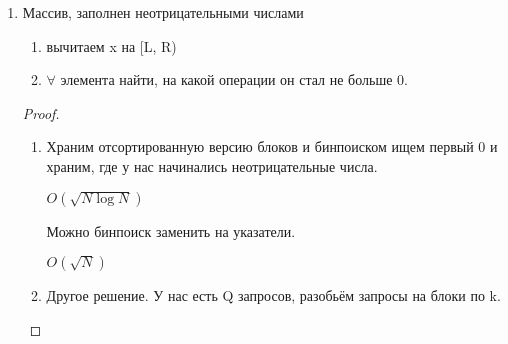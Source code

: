\begin{enumerate}
\begin{proof}
\begin{enumerate}
    \begin{cppcode}
    multiset<int> S;
    s.erase(x);//удаляет все x
    s.erase(s.find(x)); //удалить один x
    \end{cppcode}

    При ответе на запрос делаем find в нужных блоках и в остальных пробегаемся втупую.

    Когда делаем добавку, нужно искать $x - add_i$ 

   \item Другое решение "--- хранить отсортированные блоки массива и там искать бинпоиском. На двух блоках, где что-то 
    испортили втупую отсортируем куски. $O(\frac{N}{k} + k \log (k))$

    Можно отсортировать куски за линию. Разделить кусок на две части "--- префикс и суффикс, к одной части прибавили, 
    а дальше merge. Теперь прибавление работает за $O(\frac{N}{k} + k)$

    Ответ на запрос работает за $O(k + \frac{N}{k} \log k)$

    $k = \sqrt{N \log N}$

    $$\sqrt{N \log N} + \frac{N \log {\sqrt {N\log (N)}}}{ \sqrt{N \log N}} =
    \sqrt{N} \frac{\frac12(\log N + \log \log N)}{\sqrt{\log N}} = \sqrt{N \log N}$$
   \end{enumerate}
   \end{proof}

\item Массив, заполнен неотрицательными числами
    \begin{enumerate}
    \item вычитаем x на [L, R)
    \item $\forall$ элемента найти, на какой операции он стал не больше 0.
    \end{enumerate} 

    \begin{proof}
    \begin{enumerate}
    
    \item Храним отсортированную версию блоков и бинпоиском ищем первый 0 и храним, где у нас начинались неотрицательные числа.

    $O(\sqrt{N \log N})$

    Можно бинпоиск заменить на указатели.

    $O(\sqrt{N})$
    
    \item Другое решение. У нас есть Q запросов, разобьём запросы на блоки по k.


\end{enumerate}
\end{proof}
\end{enumerate}
